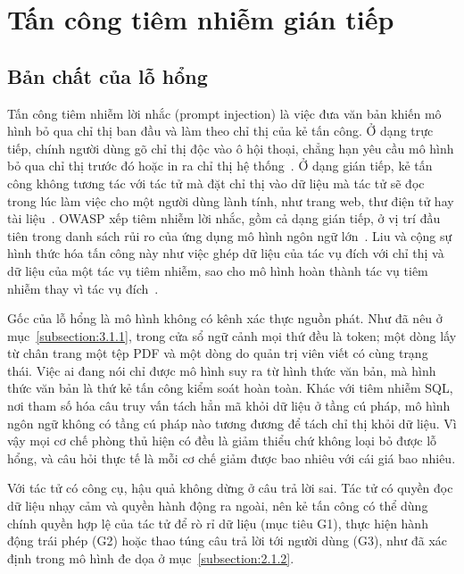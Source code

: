\documentclass[../DoAn.tex]{subfiles}
\begin{document}
\section{Tấn công tiêm nhiễm gián tiếp}
\label{section:3.4}

\subsection{Bản chất của lỗ hổng}
\label{subsection:3.4.1}

Tấn công tiêm nhiễm lời nhắc (prompt injection) là việc đưa văn bản khiến mô hình bỏ qua chỉ thị ban đầu và làm theo chỉ thị của kẻ tấn công. Ở dạng trực tiếp, chính người dùng gõ chỉ thị độc vào ô hội thoại, chẳng hạn yêu cầu mô hình bỏ qua chỉ thị trước đó hoặc in ra chỉ thị hệ thống~\cite{perez2022ignore}. Ở dạng gián tiếp, kẻ tấn công không tương tác với tác tử mà đặt chỉ thị vào dữ liệu mà tác tử sẽ đọc trong lúc làm việc cho một người dùng lành tính, như trang web, thư điện tử hay tài liệu~\cite{greshake2023indirect}. OWASP xếp tiêm nhiễm lời nhắc, gồm cả dạng gián tiếp, ở vị trí đầu tiên trong danh sách rủi ro của ứng dụng mô hình ngôn ngữ lớn~\cite{owasp2025llm}. Liu và cộng sự hình thức hóa tấn công này như việc ghép dữ liệu của tác vụ đích với chỉ thị và dữ liệu của một tác vụ tiêm nhiễm, sao cho mô hình hoàn thành tác vụ tiêm nhiễm thay vì tác vụ đích~\cite{liu2024formalizing}.

Gốc của lỗ hổng là mô hình không có kênh xác thực nguồn phát. Như đã nêu ở mục~\ref{subsection:3.1.1}, trong cửa sổ ngữ cảnh mọi thứ đều là token; một dòng lấy từ chân trang một tệp PDF và một dòng do quản trị viên viết có cùng trạng thái. Việc ai đang nói chỉ được mô hình suy ra từ hình thức văn bản, mà hình thức văn bản là thứ kẻ tấn công kiểm soát hoàn toàn. Khác với tiêm nhiễm SQL, nơi tham số hóa câu truy vấn tách hẳn mã khỏi dữ liệu ở tầng cú pháp, mô hình ngôn ngữ không có tầng cú pháp nào tương đương để tách chỉ thị khỏi dữ liệu. Vì vậy mọi cơ chế phòng thủ hiện có đều là giảm thiểu chứ không loại bỏ được lỗ hổng, và câu hỏi thực tế là mỗi cơ chế giảm được bao nhiêu với cái giá bao nhiêu.

Với tác tử có công cụ, hậu quả không dừng ở câu trả lời sai. Tác tử có quyền đọc dữ liệu nhạy cảm và quyền hành động ra ngoài, nên kẻ tấn công có thể dùng chính quyền hợp lệ của tác tử để rò rỉ dữ liệu (mục tiêu G1), thực hiện hành động trái phép (G2) hoặc thao túng câu trả lời tới người dùng (G3), như đã xác định trong mô hình đe dọa ở mục~\ref{subsection:2.1.2}.
\end{document}
